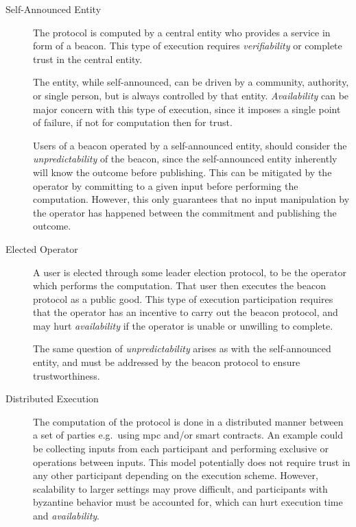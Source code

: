 \begin{description}
    \item[Self-Announced Entity]
        The protocol is computed by a central entity who provides a service in form of a beacon.
        This type of execution requires \emph{verifiability} or complete trust in the central entity.

        The entity, while self-announced, can be driven by a community, authority, or single person, but is always controlled by that entity.
        \emph{Availability} can be major concern with this type of execution, since it imposes a single point of failure, if not for computation then for trust.

        Users of a beacon operated by a self-announced entity, should consider the \emph{unpredictability} of the beacon, since the self-announced entity inherently will know the outcome before publishing.
        This can be mitigated by the operator by committing to a given input before performing the computation.
        However, this only guarantees that no input manipulation by the operator has happened between the commitment and publishing the outcome.

    \item[Elected Operator]
        A user is elected through some leader election protocol, to be the operator which performs the computation.
        That user then executes the beacon protocol as a public good.
        This type of execution participation requires that the operator has an incentive to carry out the beacon protocol, and may hurt \emph{availability} if the operator is unable or unwilling to complete.

        The same question of \emph{unpredictability} arises as with the self-announced entity, and must be addressed by the beacon protocol to ensure trustworthiness.

    \item[Distributed Execution]
        The computation of the protocol is done in a distributed manner between a set of parties e.g.\ using \gls{mpc} and/or smart contracts. An example could be collecting inputs from each participant and performing exclusive or operations between inputs. 
        This model potentially does not require trust in any other participant depending on the execution scheme.
        However, scalability to larger settings may prove difficult, and participants with byzantine behavior must be accounted for, which can hurt execution time and \emph{availability}.


\end{description}
